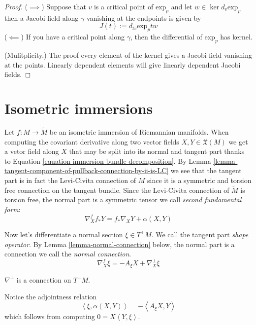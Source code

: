 \begin{proof}
($\implies$) Suppose that $v$ is a critical point of $\text{exp}_p$ and 
let $w \in \ker d_v \text{exp}_p$ then a Jacobi field along $\gamma$ 
vanishing at the endpoints is given by
$$
J(t):=d_{tv}\text{exp}_ptw
$$
($\impliedby$) If you have a critical point along $\gamma$, then the 
differential of $\text{exp}_p$ has kernel.

(Mulitplicity.) The proof every element of the kernel gives a Jacobi
 field vanishing at the points. Linearly dependent elements will give 
 linearly dependent Jacobi fields.
\end{proof}

\section{Isometric immersions}
\label{section-isometric-immersions}

Let $f:M \to \tilde{M}$ be an isometric immersion of Riemannian manifolds. When
computing the covariant derivative along two vector fields 
$X,Y \in\mathfrak{X}(M)$ we get a vetor field along $X$ that may be split into
its normal and tangent part thanks to Equation 
\ref{equation-immersion-bundle-decomposition}. By Lemma
\ref{lemma-tangent-component-of-pullback-connection-by-ii-is-LC} we see that the
 tangent part is
in fact the Levi-Civita connection of $M$ since it is a symmetric and torsion
free connection on the tangent bundle. Since the Levi-Civita connection of
$\tilde{M}$ is torsion free, the normal part is a
symmetric tensor we call {\it second fundamental form}:
\begin{equation}
\label{equation-second-fundamental-form}
\nabla^{f}_X f_*Y=f_*\nabla_XY+\alpha(X,Y)
\end{equation}

\medskip\noindent

Now let's differentiate a normal section $\xi\in T^\perp M$. 
We call the tangent part {\it shape operator}. By Lemma
\ref{lemma-normal-connection} below, the normal part is a connection 
we call the {\it normal connection}.
\begin{equation}
\label{equation-shape-operator}
\nabla^f_X\xi=-A_\xi X+\nabla^\perp_X\xi
\end{equation}
\begin{lemma}
\label{lemma-normal-connection}
$\nabla^\perp$ is a connection on $T^\perp M$.
\end{lemma}
Notice the adjointness relation
\begin{equation}
\label{equation-second-fundamental-form-and-shape-operator}
\left<\xi,\alpha(X,Y)\right>=-\left<A_\xi X,Y\right>
\end{equation}
which follows from computing $0=X\left<Y,\xi\right>$.

